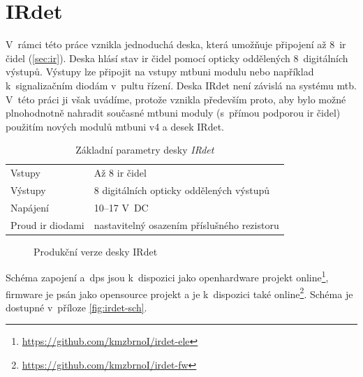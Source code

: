 \newpage
\section{IRdet} \label{sec:irdet}

V~rámci této práce vznikla jednoduchá deska, která umožňuje připojení až 8~\gls{ir}
čidel (\ref{sec:ir}). Deska hlásí stav \gls{ir} čidel pomocí opticky oddělených
8~digitálních výstupů. Výstupy lze připojit na vstupy \gls{mtbuni}
modulu nebo například k~signalizačním diodám v~pultu řízení.
Deska IRdet není závislá na systému \gls{mtb}. V~této práci ji
však uvádíme, protože vznikla především proto, aby bylo možné plnohodnotně
nahradit současné \gls{mtbuni} moduly (s~přímou podporou \gls{ir} čidel) použitím
nových modulů \gls{mtbuni} v4 a desek IRdet.

\begin{table}[h]
	\begin{tabularx}{\textwidth}{lX}
		\toprule
		Vstupy & Až 8 \gls{ir} čidel \\
		Výstupy & 8 digitálních opticky oddělených výstupů \\
		Napájení & 10–17 V~DC \\
		Proud \gls{ir} diodami & nastavitelný osazením příslušného rezistoru \\
		\bottomrule
	\end{tabularx}
	\caption{Základní parametry desky \textit{IRdet}}
	\label{tab:mtbuni-params}
\end{table}

\begin{figure}[ht!]
\caption{Produkční verze desky IRdet}
\label{fig:irdet}
\end{figure}

Schéma zapojení a~\gls{dps} jsou k~dispozici jako open\-hard\-ware
projekt online\footnote{\url{https://github.com/kmzbrnoI/irdet-ele}}, firmware
je psán jako opensource projekt a je k~dispozici také
online\footnote{\url{https://github.com/kmzbrnoI/irdet-fw}}.
Schéma je dostupné v~příloze \ref{fig:irdet-sch}.

